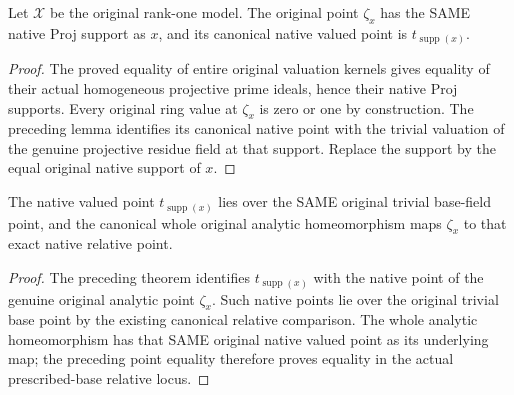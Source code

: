 \begin{theorem}
\label{thm:seven-original-native-support-trivial}
\leanok
Let $\mathcal X$ be the original rank-one model. The original point
$\zeta_x$ has the SAME native Proj support as $x$, and its canonical native
valued point is $t_{\operatorname{supp}(x)}$.
\end{theorem}
\begin{proof}
The proved equality of entire original valuation kernels gives equality
of their actual homogeneous projective prime ideals, hence their native
Proj supports. Every original ring value at $\zeta_x$ is zero or one by
construction. The preceding lemma identifies its canonical native point
with the trivial valuation of the genuine projective residue field at that
support. Replace the support by the equal original native support of $x$.
\end{proof}

\begin{theorem}
\label{thm:seven-whole-homeomorph-support-trivial}
\leanok
The native valued point $t_{\operatorname{supp}(x)}$ lies over the SAME
original trivial base-field point, and the canonical whole original
analytic homeomorphism maps $\zeta_x$ to that exact native relative point.
\end{theorem}
\begin{proof}
The preceding theorem identifies $t_{\operatorname{supp}(x)}$ with the
native point of the genuine original analytic point $\zeta_x$. Such native
points lie over the original trivial base point by the existing canonical
relative comparison. The whole analytic homeomorphism has that SAME original
native valued point as its underlying map; the preceding point equality
therefore proves equality in the actual prescribed-base relative locus.
\end{proof}

